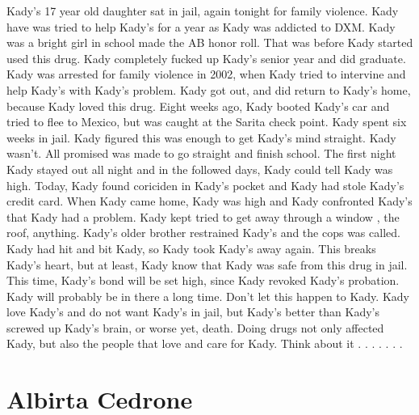 \documentclass[12pt]{book}
\begin{document}
Kady's 17 year old daughter sat in jail, again tonight for family violence. Kady have was tried to help Kady's for a year as Kady was addicted to DXM. Kady was a bright girl in school made the AB honor roll. That was before Kady started used this drug. Kady completely fucked up Kady's senior year and did graduate. Kady was arrested for family violence in 2002, when Kady tried to intervine and help Kady's with Kady's problem. Kady got out, and did return to Kady's home, because Kady loved this drug. Eight weeks ago, Kady booted Kady's car and tried to flee to Mexico, but was caught at the Sarita check point. Kady spent six weeks in jail. Kady figured this was enough to get Kady's mind straight. Kady wasn't. All promised was made to go straight and finish school. The first night Kady stayed out all night and in the followed days, Kady could tell Kady was high. Today, Kady found coriciden in Kady's pocket and Kady had stole Kady's credit card. When Kady came home, Kady was high and Kady confronted Kady's that Kady had a problem. Kady kept tried to get away through a window , the roof, anything. Kady's older brother restrained Kady's and the cops was called. Kady had hit and bit Kady, so Kady took Kady's away again. This breaks Kady's heart, but at least, Kady know that Kady was safe from this drug in jail. This time, Kady's bond will be set high, since Kady revoked Kady's probation. Kady will probably be in there a long time. Don't let this happen to Kady. Kady love Kady's and do not want Kady's in jail, but Kady's better than Kady's screwed up Kady's brain, or worse yet, death. Doing drugs not only affected Kady, but also the people that love and care for Kady. Think about it . . .   . . .  .



\chapter{Albirta Cedrone}
\end{document}
